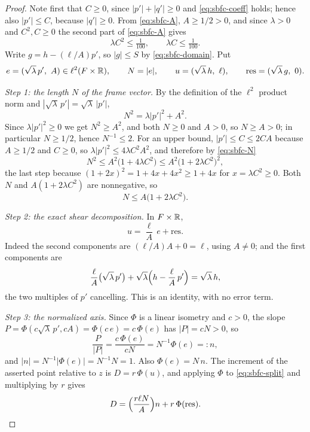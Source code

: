 \begin{proof}
Note first that $C\ge0$, since $|p'|+|q'|\ge0$ and \eqref{eq:sbfc-coeff} holds;
hence also $|p'|\le C$, because $|q'|\ge0$. From \eqref{eq:sbfc-A},
$A\ge1/2>0$, and since $\lambda>0$ and $C^2,C\ge0$ the second part of
\eqref{eq:sbfc-A} gives
\begin{equation}\label{eq:sbfc-small}
  \lambda C^2\le\tfrac1{100},\qquad \lambda C\le\tfrac1{100} .
\end{equation}
Write $g=h-(\ell/A)p'$, so $|g|\le S$ by \eqref{eq:sbfc-domain}. Put
\[
  e=(\sqrt\lambda\,p',\ A)\in\ell^2(F\times\R),\qquad N=|e|,\qquad
  u=(\sqrt\lambda\,h,\ \ell),\qquad \mathrm{res}=(\sqrt\lambda\,g,\ 0).
\]

\emph{Step 1: the length $N$ of the frame vector.}
By the definition of the $\ell^2$ product norm and $|\sqrt\lambda\,p'|
=\sqrt\lambda\,|p'|$,
\begin{equation}\label{eq:sbfc-N}
  N^2=\lambda|p'|^2+A^2 .
\end{equation}
Since $\lambda|p'|^2\ge0$ we get $N^2\ge A^2$, and both $N\ge0$ and $A>0$, so
$N\ge A>0$; in particular $N\ge1/2$, hence $N^{-1}\le2$. For an upper bound,
$|p'|\le C\le2CA$ because $A\ge1/2$ and $C\ge0$, so
$\lambda|p'|^2\le4\lambda C^2A^2$, and therefore by \eqref{eq:sbfc-N}
\[
  N^2\le A^2\bigl(1+4\lambda C^2\bigr)
     \le A^2\bigl(1+2\lambda C^2\bigr)^2,
\]
the last step because $(1+2x)^2=1+4x+4x^2\ge1+4x$ for $x=\lambda C^2\ge0$. Both
$N$ and $A(1+2\lambda C^2)$ are nonnegative, so
\begin{equation}\label{eq:sbfc-NA}
  N\le A\bigl(1+2\lambda C^2\bigr).
\end{equation}

\emph{Step 2: the exact shear decomposition.}
In $F\times\mathbb{R}$,
\begin{equation}\label{eq:sbfc-split}
  u=\frac\ell A\,e+\mathrm{res} .
\end{equation}
Indeed the second components are $(\ell/A)A+0=\ell$, using $A\ne0$; and the first
components are
\[
  \frac\ell A\bigl(\sqrt\lambda\,p'\bigr)+\sqrt\lambda\Bigl(h-\frac\ell A\,p'\Bigr)
   =\sqrt\lambda\,h ,
\]
the two multiples of $p'$ cancelling. This is an identity, with no error term.

\emph{Step 3: the normalized axis.}
Since $\Phi$ is a linear isometry and $c>0$, the slope
$P=\Phi(c\sqrt\lambda\,p',cA)=\Phi(c\,e)=c\,\Phi(e)$ has $|P|=cN>0$, so
\[
  \frac P{|P|}=\frac{c\,\Phi(e)}{cN}=N^{-1}\Phi(e)=:n ,
\]
and $|n|=N^{-1}|\Phi(e)|=N^{-1}N=1$. Also $\Phi(e)=N\,n$. The increment of the
asserted point relative to $z$ is $D=r\,\Phi(u)$, and applying $\Phi$ to
\eqref{eq:sbfc-split} and multiplying by $r$ gives
\begin{equation}\label{eq:sbfc-D}
  D=\Bigl(\frac{r\ell N}A\Bigr)n+r\,\Phi(\mathrm{res}).
\end{equation}


\end{proof}
